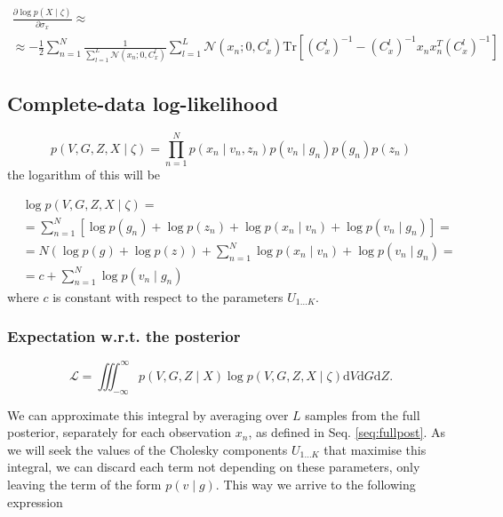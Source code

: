 \documentclass{paper}
\begin{document}
\begin{equation}
\begin{split}
\frac{\partial \log p(X \mid \zeta)}{\partial \sigma_x} \approx \\
\approx  -\frac{1}{2} \sum_{n=1}^N \frac{1}{\sum_{l=1}^{L} \mathcal{N}(x_n;0,C_x^l)}  \sum_{l=1}^{L} \mathcal{N}(x_n;0,C_x^l)  \textrm{Tr} \left[ (C_x^l)^{-1} - (C_x^l)^{-1} x_n x_n^T (C_x^l)^{-1} \right]
\end{split}
\end{equation}


\subsection{Complete-data log-likelihood}

\begin{equation}
p(V,G,Z,X \mid \zeta) = \prod_{n=1}^N p(x_n \mid v_n,z_n) p(v_n \mid g_n) p(g_n)  p(z_n)
\end{equation}
%
the logarithm of this will be

\begin{equation}
\begin{split}
& \log p(V,G,Z,X \mid \zeta )= \\ 
& = \sum_{n=1}^N  \left[ \log p(g_n) + \log p(z_n) +  \log p(x_n \mid v_n) + \log p(v_n \mid g_n) \right] = \\
& = N  (\log p(g) + \log p(z)) + \sum_{n=1}^N \log p(x_n \mid v_n) + \log p(v_n \mid g_n) = \\
& = c + \sum_{n=1}^N \log p(v_n\mid g_n)
\end{split}
\end{equation}
%
where $c$ is constant with respect to the parameters $U_{1 \dots K}$.


\subsubsection{Expectation w.r.t. the posterior}

\begin{equation}
\mathcal{L}=\iiint_{-\infty}^{\infty} p(V,G,Z \mid X)\log p(V,G,Z,X \mid \zeta) \mathrm{d}V\mathrm{d}G\mathrm{d}Z. 
\end{equation}

We can approximate this integral by averaging over $L$ samples from the full posterior, separately for each observation $x_n$, as defined in Seq. \ref{seq:fullpost}. As we will seek the values of the Cholesky components $U_{1 \dots K}$ that maximise this integral, we can discard each term not depending on these parameters, only leaving the term of the form $p(v \mid g)$. This way we arrive to the following expression 
\end{document}
